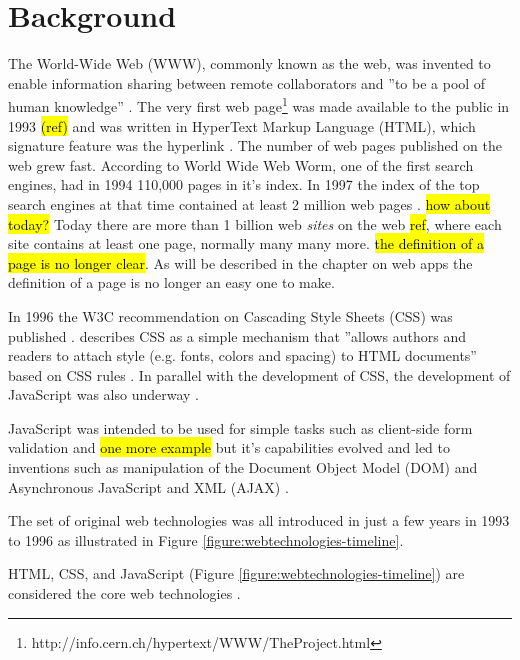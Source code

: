 \section{Background}
\label{background}

The World-Wide Web (WWW), commonly known as the web, was invented to enable information sharing between remote collaborators and ''to be a pool of human knowledge'' \parencite[76]{BernersLeeCailliauLuotonenNielsenSecret1994}. The very first web page\footnote{http://info.cern.ch/hypertext/WWW/TheProject.html} was made available to the public in 1993 \hl{(ref)} and was written in HyperText Markup Language (HTML), which signature feature was the hyperlink \parencite{BernersLeeCailliauGroffPollermann1992}. The number of web pages published on the web grew fast. According to \textcite{BrinPage1998} World Wide Web Worm, one of the first search engines, had in 1994 110,000 pages in it's index. In 1997 the index of the top search engines at that time contained at least 2 million web pages \parencite{BrinPage1998}. \hl{how about today?} Today there are more than 1 billion web \emph{sites} on the web \hl{ref}, where each site contains at least one page, normally many many more. \hl{the definition of a page is no longer clear}. As will be described in the chapter on web apps the definition of a page is no longer an easy one to make.

In 1996 the W3C recommendation on Cascading Style Sheets (CSS) was published \parencite{LieBos1996}. \citeauthor{LieBos1996} describes CSS as a simple mechanism that ''allows authors and readers to attach style (e.g. fonts, colors and spacing) to HTML documents'' based on CSS rules \parencite*[1]{LieBos1996}. In parallel with the development of CSS, the development of JavaScript was also underway \parencite{Eich2011}.

JavaScript was intended to be used for simple tasks such as client-side form validation and \hl{one more example} \parencite{Zakai2018,Moller2018} but it's capabilities evolved and led to inventions such as manipulation of the Document Object Model (DOM) \parencite{WoodLeHorsApparaoByrneChampionIsaacsJacobsNicolRobieSutor1998} and Asynchronous JavaScript and XML (AJAX) \parencite{NielsonWilliamsonArlitt2008}.

The set of original web technologies was all introduced in just a few years in 1993 to 1996 as illustrated in Figure \ref{figure:webtechnologies-timeline}.

HTML, CSS, and JavaScript (Figure \ref{figure:webtechnologies-timeline}) are considered the core web technologies \parencite{MajchrzakBiornHansenGronli2018}.

